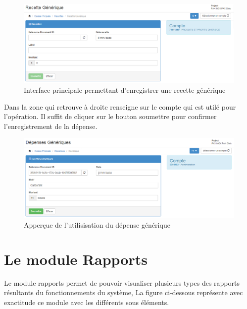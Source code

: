 \documentclass[12pt,a4paper]{report}
\begin{document}
\begin{figure}[h]
\begin{center}
\includegraphics[width=14cm]{pic/recetteGen2.png}
\end{center}
\caption{Interface principale permettant d'enregistrer une recette générique}
\label{Interface principale permettant d'enregistrer une recette générique}
\end{figure}

Dans la zone qui retrouve à droite renseigne sur le compte qui est utilé pour l'opération. Il suffit de cliquer sur le bouton soumettre pour confirmer l'enregistrement de la dépense.

\begin{figure}[h]
\begin{center}
\includegraphics[width=14cm]{pic/FormDepGen.png}
\end{center}
\caption{Apperçue de l'utilisisation du dépense générique}
\label{Apperçue de l'utilisisation du dépense générique}
\end{figure}


\newpage
\chapter{Le module Rapports}        
Le module rapports permet de pouvoir visualiser plusieurs types des rapports résultants du fonctionnements du système, La figure ci-dessous représente avec exactitude ce module avec les différents sous éléments.
\end{document}
